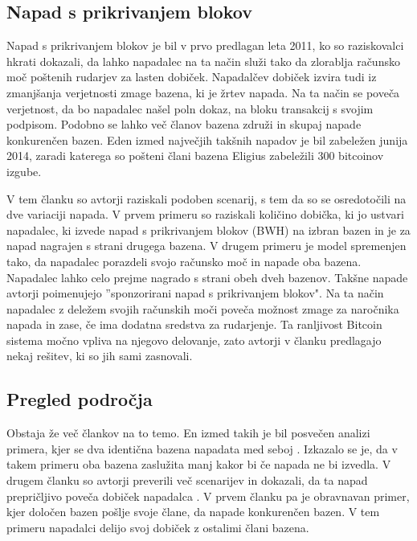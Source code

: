 \documentclass{acm_proc_article-sp}
\begin{document}
\subsection{Napad s prikrivanjem blokov} \label{sekcija2}

Napad s prikrivanjem blokov je bil v prvo predlagan leta 2011, ko so raziskovalci hkrati dokazali, da lahko napadalec na ta način služi tako da zlorablja računsko moč poštenih rudarjev za lasten dobiček. Napadalčev dobiček izvira tudi iz zmanjšanja verjetnosti zmage bazena, ki je žrtev napada. Na ta način se poveča verjetnost, da bo napadalec našel poln dokaz, na bloku transakcij s svojim podpisom. Podobno se lahko več članov bazena združi in skupaj napade konkurenčen bazen. Eden izmed največjih takšnih napadov je bil zabeležen junija 2014, zaradi katerega so pošteni člani bazena Eligius zabeležili 300 bitcoinov izgube.

V tem članku so avtorji raziskali podoben scenarij, s tem da so se osredotočili na dve variaciji napada. V prvem primeru so raziskali količino dobička, ki jo ustvari napadalec, ki izvede napad s prikrivanjem blokov (BWH) na izbran bazen in je za napad nagrajen s strani drugega bazena. V drugem primeru je model spremenjen tako, da napadalec porazdeli svojo računsko moč in napade oba bazena. Napadalec lahko celo prejme nagrado s strani obeh dveh bazenov. Takšne napade avtorji poimenujejo ''sponzorirani napad s prikrivanjem blokov". Na ta način napadalec z deležem svojih računskih moči poveča možnost zmage za naročnika napada in zase, če ima dodatna sredstva za rudarjenje.  Ta ranljivost Bitcoin sistema močno vpliva na njegovo delovanje, zato avtorji v članku predlagajo nekaj rešitev, ki so jih sami zasnovali.

\subsection{Pregled področja}
Obstaja že več člankov na to temo. En izmed takih je bil posvečen analizi primera, kjer se dva identična bazena napadata med seboj \cite{minnersdilemma}. Izkazalo se je, da v takem primeru oba bazena zaslužita manj kakor bi če napada ne bi izvedla. V drugem članku so avtorji preverili več scenarijev in dokazali, da ta napad prepričljivo poveča dobiček napadalca \cite{powersplitting}. V prvem članku \cite{minnersdilemma} pa je obravnavan primer, kjer določen bazen pošlje svoje člane, da napade konkurenčen bazen. V tem primeru napadalci delijo svoj dobiček z ostalimi člani bazena.
\end{document}
